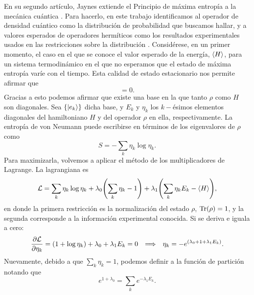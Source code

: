 En su segundo artículo, Jaynes extiende el Principio de máxima entropía a la mecánica cuántica \cite{JaynesII}. Para hacerlo, en este trabajo identificamos al operador de densidad cuántico como la distribución de probabilidad que buscamos hallar, y a valores esperados de operadores hermíticos como los resultados experimentales usados en las restricciones sobre la distribución . Considérese, en un primer momento, el caso en el que se conoce el valor esperado de la energía, $\expval{H}$, para un sistema termodinámico en el que no esperamos que el estado de máxima entropía varíe con el tiempo. Esta calidad de estado estacionario nos permite afirmar que
\begin{equation*}
    [\rho,H]=0.
\end{equation*}
Gracias a esto podemos afirmar que existe una base en la que tanto $\rho$ como $H$ son diagonales. Sea $\{\ket{e_{k}}\}$ dicha base, y $E_{k}$ y $\eta_{k}$ los $k-$ésimos elementos diagonales del hamiltoniano $H$ y del operador $\rho$ en ella, respectivamente. La entropía de von Neumann puede escribirse en términos de los eigenvalores de $\rho$ como
\begin{equation*}
    S=-\sum_{k}\eta_{k}\log{\eta_{k}}.
\end{equation*}
Para maximizarla, volvemos a aplicar el método de los multiplicadores de Lagrange. La lagrangiana es
\begin{equation*}
    \mathcal{L}=\sum_{k}\eta_{k}\log{\eta_{k}}+\lambda_{0}\qty(\sum_{k}\eta_{k}-1)+\lambda_{1}\qty(\sum_{k}\eta_{k}E_{k}-\expval{H}),
\end{equation*}
en donde la primera restricción es la normalización del estado $\rho$, $\Tr(\rho)=1$, y la segunda corresponde a la información experimental conocida. Si se deriva e iguala a cero:
\begin{align*}
    \frac{\partial \mathcal{L}}{\partial \eta_{k}}=(1+\log{\eta_{k}})+\lambda_{0}+\lambda_{1}E_{k}=0 & & \Longrightarrow  & &\eta_{k}=-e^{(\lambda_{0}+1+\lambda_{1}E_{k})}.
\end{align*}
Nuevamente, debido a que $\sum_{k}\eta_{k}=1$, podemos definir a la función de partición notando que
\begin{equation*}
    e^{1+\lambda_{0}}=\sum_{k}e^{-\lambda_{1}E_{k}}.
\end{equation*}
